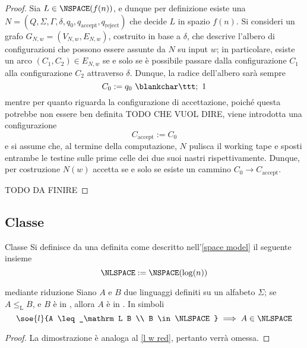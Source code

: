 \documentclass[a4paper, 12pt]{report}
\begin{document}
    \begin{proof}
        Sia $L \in \NSPACE(f(n))$, e dunque per definizione esiste una \NTM $N = (Q, \Sigma, \Gamma, \delta, q_0, q_\mathrm{accept}, q_\mathrm{reject})$ che decide $L$ in spazio $f(n)$. Si consideri un grafo $G_{N,w} = (V_{N, w}, E_{N, w})$, costruito in base a $\delta$, che descrive l'albero di configurazioni che possono essere assunte da $N$ su input $w$; in particolare, esiste un arco $(C_1, C_2) \in E_{N, w}$ se e solo se è possibile passare dalla configurazione $C_1$ alla configurazione $C_2$ attraverso $\delta$. Dunque, la radice dell'albero sarà sempre $$C_0 := q_0 \ \blankchar \ttt; \ 1$$ mentre per quanto riguarda la configurazione di accettazione, poiché questa potrebbe non essere ben definita TODO CHE VUOL DIRE, viene introdotta una configurazione $$C_\mathrm{accept} := C_0$$ e si assume che, al termine della computazione, $N$ pulisca il working tape e sposti entrambe le testine sulle prime celle dei due suoi nastri rispettivamente. Dunque, per costruzione $N(w)$ accetta se e solo se esiste un cammino $C_0 \to C_\mathrm{accept}$.

        TODO DA FINIRE
    \end{proof}

    \subsection{Classe \NLSPACE}

    \begin{frameddefn}{Classe \NLSPACE}
        Si definisce  da una \NTM definita come descritto nell'\cref{space model} il seguente insieme $$\NLSPACE := \NSPACE(\log(n))$$
    \end{frameddefn}
    
    \begin{framedthm}[label={nl w red}]{\NLSPACE mediante riduzione}
        Siano $A$ e $B$ due linguaggi definiti su un alfabeto $\Sigma$; se $A \leq_\mathrm L B$, e $B$ è in \NLSPACE, allora $A$ è in \NLSPACE. In simboli $$\soe{l}{A \leq_\mathrm L B \\ B \in \NLSPACE} \implies A \in \NLSPACE$$
    \end{framedthm}

    \begin{proof}
        La dimostrazione è analoga al \cref{l w red}, pertanto verrà omessa.
    \end{proof}
\end{document}
